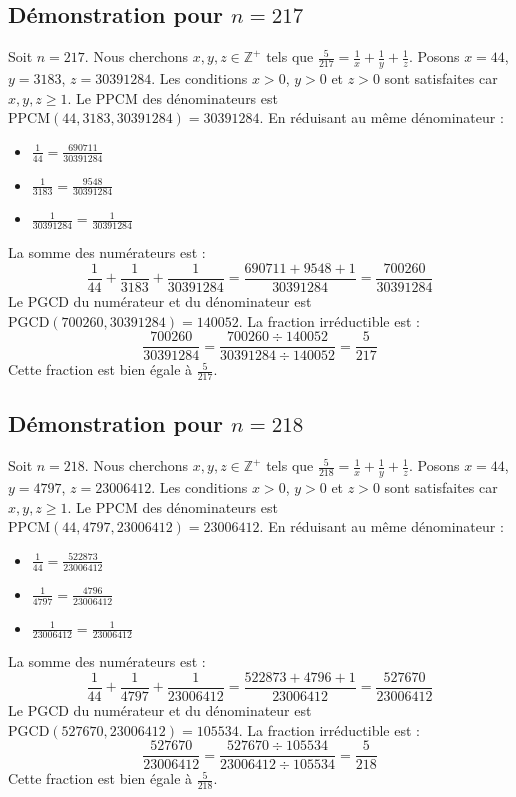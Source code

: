 \documentclass[11pt,a4paper]{article}
\begin{document}
\subsection{Démonstration pour $n = 217$}
Soit $n = 217$. Nous cherchons $x, y, z \in \mathbb{Z}^{+}$ tels que $\frac{5}{217} = \frac{1}{x} + \frac{1}{y} + \frac{1}{z}$.
Posons $x = 44$, $y = 3183$, $z = 30391284$.
Les conditions $x > 0$, $y > 0$ et $z > 0$ sont satisfaites car $x, y, z \geq 1$.
Le PPCM des dénominateurs est $\text{PPCM}(44, 3183, 30391284) = 30391284$.
En réduisant au même dénominateur :
\begin{itemize}
    \item $\frac{1}{44} = \frac{690711}{30391284}$
    \item $\frac{1}{3183} = \frac{9548}{30391284}$
    \item $\frac{1}{30391284} = \frac{1}{30391284}$
\end{itemize}
La somme des numérateurs est :
$$ \frac{1}{44} + \frac{1}{3183} + \frac{1}{30391284} = \frac{690711 + 9548 + 1}{30391284} = \frac{700260}{30391284} $$
Le PGCD du numérateur et du dénominateur est $\text{PGCD}(700260, 30391284) = 140052$.
La fraction irréductible est :
$$ \frac{700260}{30391284} = \frac{700260 \div 140052}{30391284 \div 140052} = \frac{5}{217} $$
Cette fraction est bien égale à $\frac{5}{217}$.

\subsection{Démonstration pour $n = 218$}
Soit $n = 218$. Nous cherchons $x, y, z \in \mathbb{Z}^{+}$ tels que $\frac{5}{218} = \frac{1}{x} + \frac{1}{y} + \frac{1}{z}$.
Posons $x = 44$, $y = 4797$, $z = 23006412$.
Les conditions $x > 0$, $y > 0$ et $z > 0$ sont satisfaites car $x, y, z \geq 1$.
Le PPCM des dénominateurs est $\text{PPCM}(44, 4797, 23006412) = 23006412$.
En réduisant au même dénominateur :
\begin{itemize}
    \item $\frac{1}{44} = \frac{522873}{23006412}$
    \item $\frac{1}{4797} = \frac{4796}{23006412}$
    \item $\frac{1}{23006412} = \frac{1}{23006412}$
\end{itemize}
La somme des numérateurs est :
$$ \frac{1}{44} + \frac{1}{4797} + \frac{1}{23006412} = \frac{522873 + 4796 + 1}{23006412} = \frac{527670}{23006412} $$
Le PGCD du numérateur et du dénominateur est $\text{PGCD}(527670, 23006412) = 105534$.
La fraction irréductible est :
$$ \frac{527670}{23006412} = \frac{527670 \div 105534}{23006412 \div 105534} = \frac{5}{218} $$
Cette fraction est bien égale à $\frac{5}{218}$.
\end{document}
